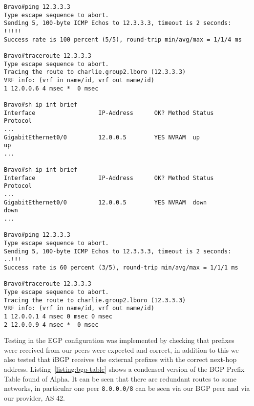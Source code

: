 \begin{lstlisting}[caption={Testing of IS-IS reaction to link failure}, label={listing:isis-testing}]
Bravo#ping 12.3.3.3
Type escape sequence to abort.
Sending 5, 100-byte ICMP Echos to 12.3.3.3, timeout is 2 seconds:
!!!!!
Success rate is 100 percent (5/5), round-trip min/avg/max = 1/1/4 ms

Bravo#traceroute 12.3.3.3
Type escape sequence to abort.
Tracing the route to charlie.group2.lboro (12.3.3.3)
VRF info: (vrf in name/id, vrf out name/id)
1 12.0.0.6 4 msec *  0 msec

Bravo#sh ip int brief
Interface                  IP-Address      OK? Method Status                Protocol
...
GigabitEthernet0/0         12.0.0.5        YES NVRAM  up                    up
...

Bravo#sh ip int brief
Interface                  IP-Address      OK? Method Status                Protocol
...
GigabitEthernet0/0         12.0.0.5        YES NVRAM  down                  down
...

Bravo#ping 12.3.3.3
Type escape sequence to abort.
Sending 5, 100-byte ICMP Echos to 12.3.3.3, timeout is 2 seconds:
..!!!
Success rate is 60 percent (3/5), round-trip min/avg/max = 1/1/1 ms

Bravo#traceroute 12.3.3.3
Type escape sequence to abort.
Tracing the route to charlie.group2.lboro (12.3.3.3)
VRF info: (vrf in name/id, vrf out name/id)
1 12.0.0.1 4 msec 0 msec 0 msec
2 12.0.0.9 4 msec *  0 msec
\end{lstlisting}

Testing in the EGP configuration was implemented by checking that prefixes were received from our peers were expected and correct, in addition to this we also tested that iBGP receives the external prefixes with the correct next-hop address. Listing~\ref{listing:bgp-table} shows a condensed version of the BGP Prefix Table found of Alpha. It can be seen that there are redundant routes to some networks, in particular one peer \texttt{8.0.0.0/8} can be seen via our BGP peer and via our provider, AS 42.

